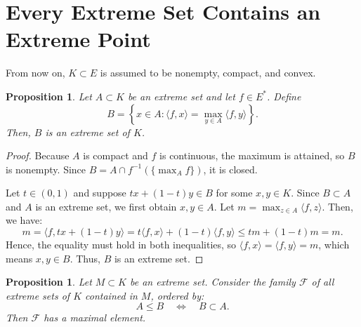 \documentclass[reqno]{amsart}
\newtheorem{proposition}[theorem]{Proposition}
\theoremstyle{definition}
\newcommand{\ip}[2]{\langle #1, #2 \rangle}
\begin{document}
\section{Every Extreme Set Contains an Extreme Point}

From now on, $K \subset E$ is assumed to be nonempty, compact, and convex.

\begin{proposition}\label{prop:support-face}
Let $A \subset K$ be an extreme set and let $f \in E^*$. Define
\begin{equation}
    B = \left\{x \in A : \ip{f}{x} = \max_{y \in A} \ip{f}{y} \right\}.
\end{equation}
Then, $B$ is an extreme set of $K$.
\end{proposition}

\begin{proof}
Because $A$ is compact and $f$ is continuous, the maximum is attained, so $B$ is nonempty.
Since $B = A \cap f^{-1}(\{\max_A f\})$, it is closed.

Let $t \in (0,1)$ and suppose $tx + (1-t)y \in B$ for some $x,y \in K$. Since $B \subset A$ and $A$ is an extreme set, we first obtain $x,y \in A$. Let $m = \max_{z \in A} \ip{f}{z}$. Then, we have:
\begin{equation*}
    m = \ip{f}{tx + (1-t)y} = t\ip{f}{x} + (1-t)\ip{f}{y} \le tm + (1-t)m = m.
\end{equation*}
Hence, the equality must hold in both inequalities, so $\ip{f}{x} = \ip{f}{y} = m$, which means $x,y \in B$. Thus, $B$ is an extreme set.
\end{proof}

\begin{proposition}\label{prop:zorn}
Let $M \subset K$ be an extreme set. Consider the family $\mathcal{F}$ of all extreme sets of $K$ contained in $M$, ordered by:
\begin{equation}
    A \leq B \quad \Longleftrightarrow \quad B \subset A.
\end{equation}
Then $\mathcal{F}$ has a maximal element.
\end{proposition}
\end{document}
